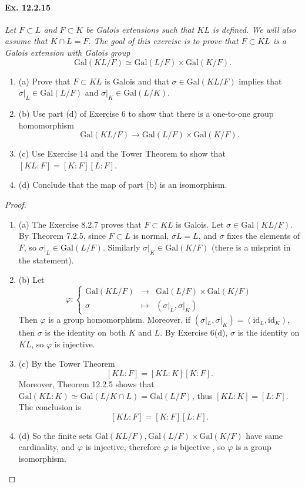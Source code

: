 \documentclass[11pt,a4paper]{article}
\newcommand{\be} {\begin{enumerate}}
\newcommand{\ee} {\end{enumerate}}
\newcommand{\Gal}{\mathrm{Gal}}
\begin{document}
\paragraph{Ex. 12.2.15}

{\it Let $F \subset L$ and $F \subset K$ be Galois extensions such that $KL$ is defined. We will also assume that $K\cap L = F$. The goal of this exercise is to prove that $F \subset KL$ is a Galois extension with Galois group
$$\Gal(KL/F) \simeq \Gal(L/F) \times \Gal(K/F).$$
\be
\item[(a)] Prove that $F \subset KL$ is Galois and that $\sigma \in \Gal(KL/F)$ implies that $\sigma \vert_L \in \Gal(L/F)$ and $\sigma \vert_K \in \Gal(L/K)$.

\item[(b)] Use part (d) of Exercise 6 to show that there is a one-to-one group homomorphism
$$\Gal(KL/F) \to \Gal(L/F) \times \Gal(K/F).$$

\item[(c)] Use Exercise 14 and the Tower Theorem to show that $[KL:F] = [K:F][L:F]$.

\item[(d)] Conclude that the map of part (b) is an isomorphism.
\ee
}

\begin{proof}
\be
\item[(a)] The Exercise 8.2.7 proves that $F \subset KL$ is Galois. Let $\sigma \in \Gal(KL/F)$. By Theorem 7.2.5, since $F \subset L$ is normal, $\sigma L = L$, and $\sigma$ fixes the elements of $F$, so $\sigma|_L \in \Gal(L/F)$. Similarly $\sigma \vert_K \in \Gal(K/F)$ (there is a misprint in the statement).

\item[(b)] Let
$$\varphi :
\left\{
\begin{array}{lll}
\Gal(KL/F)& \to& \Gal(L/F) \times \Gal(K/F)\\
\sigma &\mapsto & (\sigma|_L, \sigma \vert_K)
\end{array}
\right.
$$
Then $\varphi$ is a group homomorphism. Moreover, if $(\sigma|_L, \sigma|_K) = (\mathrm{id}_L,\mathrm{id}_K)$, then $\sigma$ is the identity on both $K$ and $L$. By Exercise 6(d), $\sigma$ is the identity on $KL$, so $\varphi$ is injective.

\item[(c)] By the Tower Theorem
$$[KL : F] = [KL:K][K:F].$$
Moreover, Theorem 12.2.5 shows that $\Gal(KL:K) \simeq \Gal(L/K\cap L) = \Gal(L/F)$, thus $[KL:K] = [L:F]$. The conclusion is
$$[KL:F] = [K:F][L:F].$$

\item[(d)] So the finite sets $\Gal(KL/F),  \Gal(L/F) \times \Gal(K/F)$ have same cardinality, and $\varphi$ is injective, therefore $\varphi$ is bijective , so $\varphi$ is a group isomorphism.
\ee
\end{proof}
\end{document}
